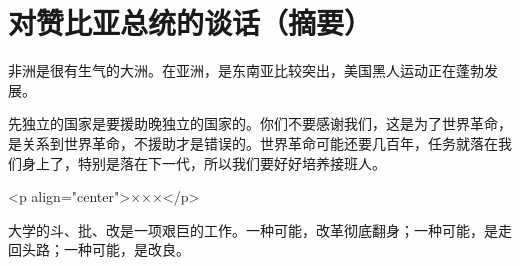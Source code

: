 \section[对赞比亚总统的谈话（摘要）（一九六七年六月）]{对赞比亚总统的谈话（摘要）}


非洲是很有生气的大洲。在亚洲，是东南亚比较突出，美国黑人运动正在蓬勃发展。

先独立的国家是要援助晚独立的国家的。你们不要感谢我们，这是为了世界革命，是关系到世界革命，不援助才是错误的。世界革命可能还要几百年，任务就落在我们身上了，特别是落在下一代，所以我们要好好培养接班人。

<p align="center">×××</p>

大学的斗、批、改是一项艰巨的工作。一种可能，改革彻底翻身；一种可能，是走回头路；一种可能，是改良。


